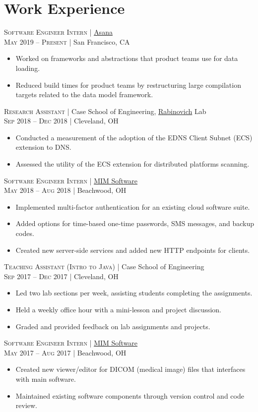\documentclass[a4paper,11pt]{article}
\begin{document}
\section{Work Experience}
\textsc{Software Engineer Intern} | \href{https://asana.com}{Asana} \\
\textsc{May 2019 – Present} | San Francisco, CA
\begin{itemize}
	\item Worked on frameworks and abstractions that product teams use for data loading.
	\item Reduced build times for product teams by restructuring large compilation targets related to the data model framework.
\end{itemize}
\vskip 2mm
\textsc{Research Assistant} | Case School of Engineering, \href{http://engr.case.edu/rabinovich_michael/}{Rabinovich} Lab \\
\textsc{Sep 2018 – Dec 2018} | Cleveland, OH
\begin{itemize}
	\item Conducted a measurement of the adoption of the EDNS Client Subnet (ECS) extension to DNS.
	\item Assessed the utility of the ECS extension for distributed platforms scanning.
\end{itemize}
\vskip 2mm
\textsc{Software Engineer Intern} | \href{https://www.mimsoftware.com}{MIM Software} \\
\textsc{May 2018 – Aug 2018} | Beachwood, OH
\begin{itemize}
	\item Implemented multi-factor authentication for an existing cloud software suite.
	\item Added options for time-based one-time passwords, SMS messages, and backup codes.
	\item Created new server-side services and added new HTTP endpoints for clients.
\end{itemize}
\vskip 2mm
\textsc{Teaching Assistant (Intro to Java)} | Case School of Engineering \\
 \textsc{Sep 2017 – Dec 2017} | Cleveland, OH
 \begin{itemize}
	 \item	Led two lab sections per week, assisting students completing the assignments.
	 \item Held a weekly office hour with a mini-lesson and project discussion.
	 \item Graded and provided feedback on lab assignments and projects.
 \end{itemize}
 \vskip 2mm
 \textsc{Software Engineer Intern} | \href{https://www.mimsoftware.com}{MIM Software} \\
 \textsc{May 2017 – Aug 2017} | Beachwood, OH
 \begin{itemize}
	\item Created new viewer/editor for DICOM (medical image) files that interfaces with main software.
	\item Maintained existing software components through version control and code review.
 \end{itemize}
\end{document}
